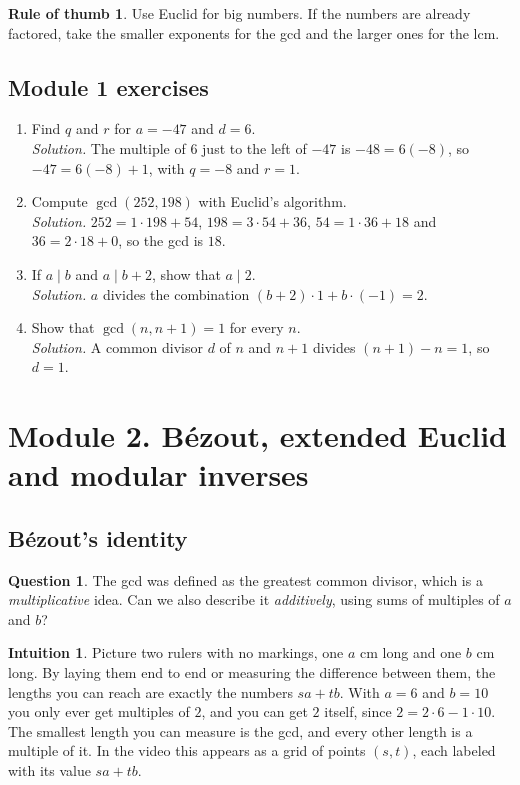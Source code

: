\documentclass[11pt,a4paper]{article}
\theoremstyle{definition}
\theoremstyle{noteit}
\newtheorem*{question}{Question}
\theoremstyle{note}
\newtheorem*{intuition}{Intuition}
\newtheorem*{thumbrule}{Rule of thumb}
\begin{document}
\begin{thumbrule}
Use Euclid for big numbers. If the numbers are already factored, take the smaller exponents for the gcd and the larger ones for the lcm.
\end{thumbrule}

\subsection*{Module 1 exercises}
\begin{enumerate}[label=\textbf{1.\arabic*}]
\item Find $q$ and $r$ for $a=-47$ and $d=6$.\\
\emph{Solution.} The multiple of 6 just to the left of $-47$ is $-48=6(-8)$, so $-47=6(-8)+1$, with $q=-8$ and $r=1$.
\item Compute $\gcd(252,198)$ with Euclid's algorithm.\\
\emph{Solution.} $252=1\cdot198+54$, $198=3\cdot54+36$, $54=1\cdot36+18$ and $36=2\cdot18+0$, so the gcd is $18$.
\item If $a\mid b$ and $a\mid b+2$, show that $a\mid 2$.\\
\emph{Solution.} $a$ divides the combination $(b+2)\cdot1+b\cdot(-1)=2$.
\item Show that $\gcd(n,n+1)=1$ for every $n$.\\
\emph{Solution.} A common divisor $d$ of $n$ and $n+1$ divides $(n+1)-n=1$, so $d=1$.
\end{enumerate}

\newpage
\section{Module 2. Bézout, extended Euclid and modular inverses}

\subsection{Bézout's identity}

\begin{question}
The gcd was defined as the greatest common divisor, which is a \emph{multiplicative} idea. Can we also describe it \emph{additively}, using sums of multiples of $a$ and $b$?
\end{question}

\begin{intuition}
Picture two rulers with no markings, one $a$ cm long and one $b$ cm long. By laying them end to end or measuring the difference between them, the lengths you can reach are exactly the numbers $sa+tb$. With $a=6$ and $b=10$ you only ever get multiples of $2$, and you can get $2$ itself, since $2=2\cdot6-1\cdot10$. The smallest length you can measure is the gcd, and every other length is a multiple of it. In the video this appears as a grid of points $(s,t)$, each labeled with its value $sa+tb$.
\end{intuition}
\end{document}
